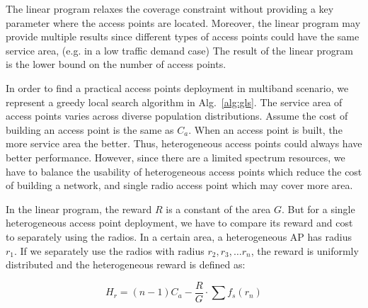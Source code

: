 

The linear program relaxes the coverage constraint without providing a key parameter
where the access points are located. Moreover, the linear program may provide 
multiple results since different types of access points could have the same service area, 
(e.g. in a low traffic demand case) The result of the linear program is the lower bound
on the number of access points. 

In order to find a practical access points deployment in multiband scenario, we represent 
a greedy local search algorithm in Alg.~\ref{alg:gls}. The service area of access points varies 
across diverse population distributions. Assume the cost of building an access point is the same as $C_a$. 
When an access point is built, the more service area the better. Thus, heterogeneous access points
could always have better performance. However, since there are a limited spectrum resources,
we have to balance the usability of heterogeneous access points which reduce the cost of building 
a network, and single radio access point which may cover more area.

In the linear program, the reward $R$ is a constant of the area $G$. But for a single heterogeneous access
point deployment, we have to compare its reward and cost to separately using the radios.
In a certain area, a heterogeneous AP has radius $r_1$. If we separately use the radios with
radius $r_2,r_3,\dots r_n$, the reward is uniformly distributed and the heterogeneous reward is defined as:

\begin{equation}
\label{eq:unitprice}
H_r=(n-1) C_a - \frac{R}{G}\cdot\sum f_s(r_n)
\end{equation}

